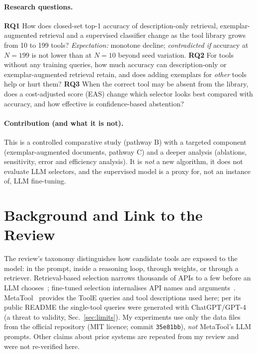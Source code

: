\documentclass[10pt,twocolumn]{article}
\begin{document}
\paragraph{Research questions.}
\textbf{RQ1} How does closed-set top-1 accuracy of description-only retrieval, exemplar-augmented retrieval and a supervised classifier change as the tool library grows from 10 to 199 tools? \emph{Expectation:} monotone decline; \emph{contradicted if} accuracy at $N{=}199$ is not lower than at $N{=}10$ beyond seed variation.
\textbf{RQ2} For tools without any training queries, how much accuracy can description-only or exemplar-augmented retrieval retain, and does adding exemplars for \emph{other} tools help or hurt them?
\textbf{RQ3} When the correct tool may be absent from the library, does a cost-adjusted score (EAS) change which selector looks best compared with accuracy, and how effective is confidence-based abstention?

\paragraph{Contribution (and what it is not).} This is a controlled comparative study (pathway B) with a targeted component (exemplar-augmented documents, pathway C) and a deeper analysis (ablations, sensitivity, error and efficiency analysis). It is \emph{not} a new algorithm, it does not evaluate LLM selectors, and the supervised model is a proxy for, not an instance of, LLM fine-tuning.

\section{Background and Link to the Review}
The review's taxonomy distinguishes how candidate tools are exposed to the model: in the prompt, inside a reasoning loop, through weights, or through a retriever. Retrieval-based selection narrows thousands of APIs to a few before an LLM chooses~\cite{du2024anytool,song2023restgpt}; fine-tuned selection internalises API names and arguments~\cite{patil2023gorilla,qin2023toolllm}. MetaTool~\cite{huang2024metatool} provides the ToolE queries and tool descriptions used here; per its public README the single-tool queries were generated with ChatGPT/GPT-4 (a threat to validity, Sec.~\ref{sec:limits}). My experiments use only the data files from the official repository (MIT licence; commit \texttt{35e81bb}), \emph{not} MetaTool's LLM prompts. Other claims about prior systems are repeated from my review and were not re-verified here.
\end{document}
